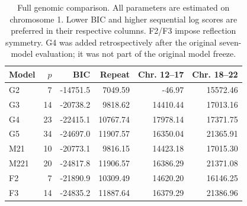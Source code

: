 \begin{table}[htbp]
\centering
\small
\caption{Full genomic comparison. All parameters are estimated on chromosome 1. Lower BIC and higher sequential log scores are preferred in their respective columns. F2/F3 impose reflection symmetry. G4 was added retrospectively after the original seven-model evaluation; it was not part of the original model freeze.}
\label{tab:si-genomic-comparison}
\begin{tabular}{lrrrrr}
\toprule
Model & $p$ & BIC & Repeat & Chr. 12--17 & Chr. 18--22 \\
\midrule
G2 & 7 & -14751.5 & 7049.59 & -46.97 & 15572.46 \\
G3 & 14 & -20738.2 & 9818.62 & 14410.44 & 17013.16 \\
G4 & 23 & -22415.1 & 10767.74 & 17978.14 & 17371.75 \\
G5 & 34 & -24697.0 & 11907.57 & 16350.04 & 21365.91 \\
M21 & 10 & -20773.1 & 9816.15 & 14423.18 & 17015.30 \\
M221 & 20 & -24817.8 & 11906.57 & 16386.29 & 21371.08 \\
F2 & 7 & -21890.9 & 10309.49 & 14620.20 & 16146.25 \\
F3 & 14 & -24835.2 & 11887.64 & 16379.29 & 21386.96 \\
\bottomrule
\end{tabular}
\end{table}
